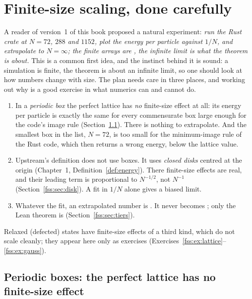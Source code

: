 
\section{Finite-size scaling, done carefully}\label{fss:sec}

A reader of version~1 of this book proposed a natural experiment: \emph{run the Rust crate at $N=72$, $288$ and
$1152$, plot the energy per particle against $1/N$, and extrapolate to $N=\infty$; the finite arrays are \tierX, the
infinite limit is what the theorem is about.} This is a common first idea, and the instinct behind it is sound:
a simulation is finite, the theorem is about an infinite limit, so one should look at how numbers change with size.
The plan needs care in three places, and working out why is a good exercise in what numerics can and cannot do.
\begin{enumerate}
\item In a \emph{periodic box} the perfect lattice has \emph{no} finite-size effect at all: its energy per particle is
exactly the same for every commensurate box large enough for the code's image rule (Section~\ref{fss:sec:box}).
There is nothing to extrapolate. And the smallest box in the list, $N=72$, is too small for the minimum-image rule of
the Rust code, which then returns a wrong energy, below the lattice value.
\item Upstream's definition does not use boxes. It uses \emph{closed disks} centred at the origin
(Chapter~1, Definition~\ref{def:energy}). There finite-size effects are real, and their leading term is proportional
to $N^{-1/2}$, not $N^{-1}$ (Section~\ref{fss:sec:disk}). A fit in $1/N$ alone gives a biased limit.
\item Whatever the fit, an extrapolated number is \tierX. It never becomes \tierA; only the Lean theorem is
(Section~\ref{fss:sec:tiers}).
\end{enumerate}
Relaxed (defected) states have finite-size effects of a third kind, which do not scale cleanly; they appear here only as
exercises (Exercises~\ref{fss:ex:lattice}--\ref{fss:ex:gauss}).

\subsection{Periodic boxes: the perfect lattice has no finite-size effect}\label{fss:sec:box}

